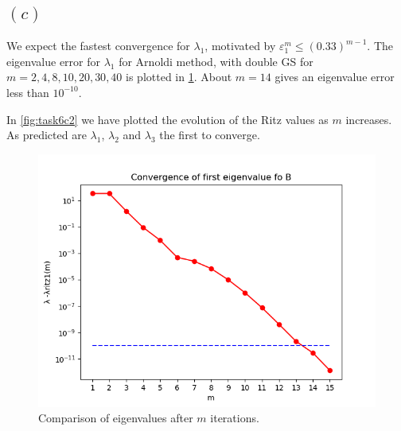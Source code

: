 \subsection{$(c)$}
We expect the fastest convergence for $\lambda_{1}$, motivated by $\varepsilon_{1}^{m}\leq (0.33)^{m-1}$. The eigenvalue error for $\lambda_{1}$ for Arnoldi method, with double GS for $m = 2, 4, 8, 10, 20, 30, 40$ is plotted in \ref{fig:task6c1}. About $m = 14$ gives an eigenvalue error less than $10^{-10}$.

In \ref{fig:task6c2} we have plotted the evolution of the Ritz values as $m$ increases. As predicted are $\lambda_{1}$, $\lambda_2$ and $\lambda_{3}$ the first to converge.
\begin{figure}[h!]
\centering
\includegraphics[scale=0.8]{../task6/task6c_eigConv.png}
\caption{Comparison of eigenvalues after $m$ iterations.}
\label{fig:task6c1}
\end{figure}

